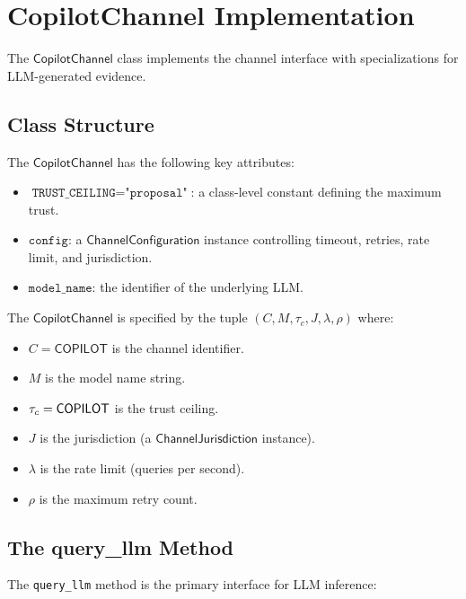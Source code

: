 \documentclass[11pt]{article}
\newcommand{\CopChan}{\mathsf{CopilotChannel}}
\newcommand{\ChanConfig}{\mathsf{ChannelConfiguration}}
\newcommand{\ChanJuris}{\mathsf{ChannelJurisdiction}}
\newcommand{\CopQuery}{\texttt{query\_llm}}
\begin{document}
\section{CopilotChannel Implementation}
\label{sec:impl}

The $\CopChan$ class implements the channel interface with
specializations for LLM-generated evidence.

\subsection{Class Structure}
\label{sec:impl:structure}

The $\CopChan$ has the following key attributes:
\begin{itemize}[leftmargin=2em]
\item $\texttt{TRUST\_CEILING} = \texttt{"proposal"}$: a class-level
  constant defining the maximum trust.
\item $\texttt{config}$: a $\ChanConfig$ instance controlling
  timeout, retries, rate limit, and jurisdiction.
\item $\texttt{model\_name}$: the identifier of the underlying LLM.
\end{itemize}

\begin{definition}
\label{def:copilot-spec}
The $\CopChan$ is specified by the tuple
$(C, M, \tau_c, J, \lambda, \rho)$ where:
\begin{itemize}[leftmargin=2em]
\item $C = \mathsf{COPILOT}$ is the channel identifier.
\item $M$ is the model name string.
\item $\tau_c = \mathsf{COPILOT}$ is the trust ceiling.
\item $J$ is the jurisdiction (a $\ChanJuris$ instance).
\item $\lambda$ is the rate limit (queries per second).
\item $\rho$ is the maximum retry count.
\end{itemize}
\end{definition}

\subsection{The query\_llm Method}
\label{sec:impl:query}

The \CopQuery{} method is the primary interface for LLM inference:
\end{document}
